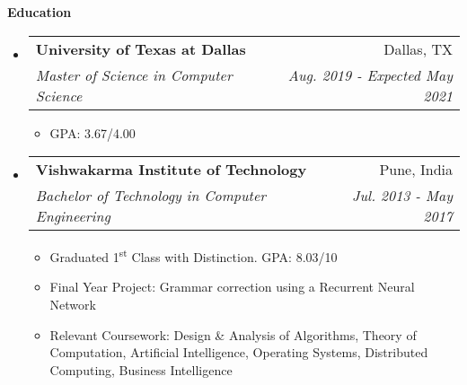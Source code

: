 \documentclass[letterpaper,12pt]{article}
\makeatletter
\newcommand{\ts}{\textsuperscript}
\newcommand{\resitem}[1]{\item #1 \vspace{-2pt}}
\newcommand{\resheading}[1]{{\large \colorbox{mygrey}{\begin{minipage}{\textwidth}{\textbf{#1 \vphantom{p\^{E}}}}\end{minipage}}}}
\newcommand{\ressubheading}[4]{
    \begin{tabular*}{7.0in}{l@{\extracolsep{\fill}}r}
      \textbf{#1} & #2 \\
      \textit{#3} & \textit{#4} \\
    \end{tabular*}\vspace{-6pt}}
\newif\ifhighschool
\makeatother
\begin{document}
  \resheading{Education}
  \begin{itemize}
  \item
    \ressubheading{University of Texas at Dallas}{Dallas, TX}{Master of Science in Computer Science}{Aug. 2019 - Expected May 2021}
    \begin{itemize}
      \resitem {GPA: 3.67/4.00}
    \end{itemize}
  \item
    \ressubheading{Vishwakarma Institute of Technology}{Pune, India}{Bachelor of Technology in Computer Engineering}{Jul. 2013 - May 2017}
    \begin{itemize}
      \resitem {Graduated 1\ts{st} Class with Distinction. GPA: 8.03/10}
      \resitem {Final Year Project: Grammar correction using a Recurrent Neural Network}
      \resitem{Relevant Coursework: Design \& Analysis of Algorithms, Theory of Computation, Artificial Intelligence, Operating Systems, Distributed Computing, Business Intelligence}
    \end{itemize}
    \ifhighschool	
  \item
    \ressubheading{Delhi Public School}{Pune, India}{12th Grade CBSE}{May 2013}
    \begin{itemize}
      \resitem{Percentage: 76.4\%}
    \end{itemize}
  \item
    \ressubheading{Delhi Public School}{Pune, India}{10th Grade CBSE}{May 2011}
    \begin{itemize}
      \resitem{CGPA: 8.6}
    \end{itemize}
    \fi
  \end{itemize}
  
  \pagebreak
  
\end{document}

